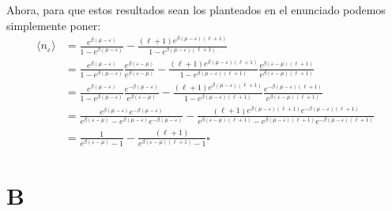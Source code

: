 \documentclass{report}
\begin{document}
Ahora, para que estos resultados sean los planteados en el enunciado podemos simplemente poner:
\begin{align*}
  \langle n_\varepsilon \rangle &= \frac{ e^{\beta(\mu - \varepsilon)}}{1 - e^{\beta(\mu - \varepsilon)}} - \frac{(\ell + 1) e^{\beta (\mu - \varepsilon) (\ell + 1)}}{1 - e^{\beta (\mu - \varepsilon) (\ell + 1)}}\\
  &= \frac{ e^{\beta(\mu - \varepsilon)}}{1 - e^{\beta(\mu - \varepsilon)}}\frac{e^{\beta(\varepsilon - \mu)}}{e^{\beta(\varepsilon - \mu)}} - \frac{(\ell + 1) e^{\beta (\mu - \varepsilon) (\ell + 1)}}{1 - e^{\beta (\mu - \varepsilon) (\ell + 1)}}\frac{e^{\beta (\varepsilon - \mu) (\ell + 1)}}{e^{\beta (\varepsilon - \mu) (\ell + 1)}}\\
  &= \frac{ e^{\beta(\mu - \varepsilon)}}{1 - e^{\beta(\mu - \varepsilon)}}\frac{e^{- \beta(\mu - \varepsilon)}}{e^{\beta(\varepsilon - \mu)}} - \frac{(\ell + 1) e^{\beta (\mu - \varepsilon) (\ell + 1)}}{1 - e^{\beta (\mu - \varepsilon) (\ell + 1)}}\frac{e^{ - \beta (\mu - \varepsilon) (\ell + 1)}}{e^{\beta (\varepsilon - \mu) (\ell + 1)}}\\
  &= \frac{ e^{\beta(\mu - \varepsilon)}e^{- \beta(\mu - \varepsilon)}}{e^{\beta(\varepsilon - \mu)} - e^{\beta(\mu - \varepsilon)}e^{-\beta(\mu - \varepsilon)}} - \frac{(\ell + 1) e^{\beta (\mu - \varepsilon) (\ell + 1)} e^{ - \beta (\mu - \varepsilon) (\ell + 1)} }{ e^{\beta (\varepsilon - \mu) (\ell + 1)} - e^{\beta (\mu - \varepsilon) (\ell + 1)} e^{-\beta (\mu - \varepsilon) (\ell + 1)}}\\
  &= \frac{1}{e^{\beta(\varepsilon - \mu)} - 1} - \frac{(\ell + 1)}{ e^{\beta (\varepsilon - \mu) (\ell + 1)} - 1}\square
\end{align*}

\section{B}
\end{document}
